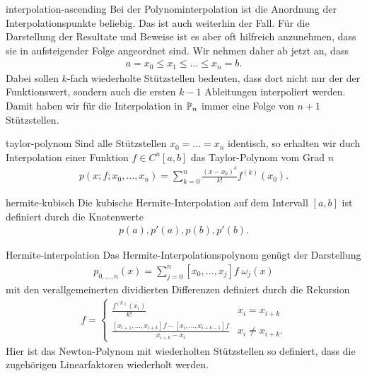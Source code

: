 \begin{Notation}{interpolation-ascending}
  Bei der Polynominterpolation ist die Anordnung der
  Interpolationspunkte beliebig. Das ist auch weiterhin der Fall. Für
  die Darstellung der Resultate und Beweise ist es aber oft hilfreich
  anzunehmen, dass sie in aufsteigender Folge angeordnet sind. Wir
  nehmen daher ab jetzt an, dass
  \begin{gather}
    a = x_0 \le x_1 \le \dots \le x_n = b.
  \end{gather}
  Dabei sollen $k$-fach wiederholte Stützstellen bedeuten, dass dort
  nicht nur der der Funktionswert, sondern auch die ersten $k-1$
  Ableitungen interpoliert werden. Damit haben wir für die
  Interpolation in $\P_n$ immer eine Folge von $n+1$ Stützstellen.
\end{Notation}

\begin{Beispiel}{taylor-polynom}
  Sind alle Stützstellen $x_0 = \dots = x_n$ identisch, so erhalten
  wir duch Interpolation einer Funktion $f\in C^n[a,b]$ das
  Taylor-Polynom vom Grad $n$
  \begin{gather}
    p(x;f;x_0,\dots,x_n) = \sum_{k=0}^n \frac{(x-x_0)^k}{k!} f^{(k)}(x_0).
  \end{gather}
\end{Beispiel}

\begin{Beispiel}{hermite-kubisch}
  Die kubische Hermite-Interpolation auf dem Intervall $[a,b]$ ist
  definiert durch die Knotenwerte
  \begin{gather}
    p(a), p'(a), p(b), p'(b).
  \end{gather}
\end{Beispiel}

\begin{Satz}{Hermite-interpolation}
  Das Hermite-Interpolationspolynom genügt der Darstellung
  \begin{gather}
    p_{0,\dots,n}(x) = \sum_{j=0}^n [x_0,\dots,x_j]f\;\omega_j(x)
  \end{gather}
  mit den verallgemeinerten dividierten Differenzen definiert durch
  die Rekursion
  \begin{gather}
    [x_i,\dots,x_{i+k}]f =
    \begin{cases}
      \frac{f^{(k)}(x_i)}{k!} &x_i=x_{i+k}\\
      \frac{[x_{i+1},\dots,x_{i+k}]f - [x_i,\dots,x_{i+k-1}]f}{x_{i+k}-x_i}
      &x_i\neq x_{i+k}.
    \end{cases}
  \end{gather}
  Hier ist das Newton-Polynom mit wiederholten Stützstellen so
  definiert, dass die zugehörigen Linearfaktoren wiederholt werden.
\end{Satz}

